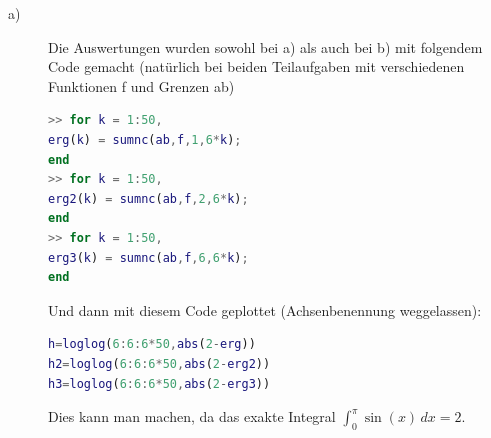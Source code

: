 \documentclass[11pt,a4paper,ngerman]{article}
\begin{document}
\begin{description}
\item[a)] 
Die Auswertungen wurden sowohl bei a) als auch bei b) mit folgendem Code gemacht (natürlich bei beiden Teilaufgaben mit verschiedenen Funktionen f und Grenzen ab)
\begin{lstlisting}[language=matlab]
>> for k = 1:50,                         
erg(k) = sumnc(ab,f,1,6*k);           
end
>> for k = 1:50,              
erg2(k) = sumnc(ab,f,2,6*k);
end
>> for k = 1:50,               
erg3(k) = sumnc(ab,f,6,6*k);
end
\end{lstlisting}

Und dann mit diesem Code geplottet (Achsenbenennung weggelassen):

\begin{lstlisting}[language=matlab]
h=loglog(6:6:6*50,abs(2-erg)) 
h2=loglog(6:6:6*50,abs(2-erg2)) 
h3=loglog(6:6:6*50,abs(2-erg3)) 
\end{lstlisting}

Dies kann man machen, da das exakte Integral $\int_0^{\pi} \sin(x) \, dx = 2$.


\end{description}
\end{document}
